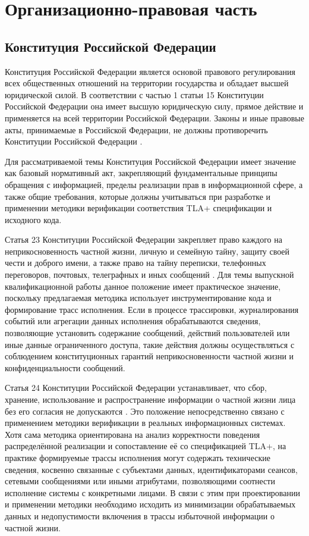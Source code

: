 
\section{Организационно-правовая часть}

\subsection{Конституция Российской Федерации}

Конституция Российской Федерации является основой правового регулирования
всех общественных отношений на территории государства и обладает высшей
юридической силой. В соответствии с частью 1 статьи 15 Конституции
Российской Федерации она имеет высшую юридическую силу, прямое действие и
применяется на всей территории Российской Федерации. Законы и иные
правовые акты, принимаемые в Российской Федерации, не должны противоречить
Конституции Российской Федерации \cite{constitution_rf}.

Для рассматриваемой темы Конституция Российской Федерации имеет значение
как базовый нормативный акт, закрепляющий фундаментальные принципы
обращения с информацией, пределы реализации прав в информационной сфере, а
также общие требования, которые должны учитываться при разработке и
применении методики верификации соответствия TLA+ спецификации и исходного
кода.

Статья 23 Конституции Российской Федерации закрепляет право каждого на
неприкосновенность частной жизни, личную и семейную тайну, защиту своей
чести и доброго имени, а также право на тайну переписки, телефонных
переговоров, почтовых, телеграфных и иных сообщений \cite{constitution_rf}.
Для темы выпускной квалификационной работы данное положение имеет
практическое значение, поскольку предлагаемая методика использует
инструментирование кода и формирование трасс исполнения. Если в процессе
трассировки, журналирования событий или агрегации данных исполнения
обрабатываются сведения, позволяющие установить содержание сообщений,
действий пользователей или иные данные ограниченного доступа, такие
действия должны осуществляться с соблюдением конституционных гарантий
неприкосновенности частной жизни и конфиденциальности сообщений.

Статья 24 Конституции Российской Федерации устанавливает, что сбор,
хранение, использование и распространение информации о частной жизни лица
без его согласия не допускаются \cite{constitution_rf}. Это положение
непосредственно связано с применением методики верификации в реальных
информационных системах. Хотя сама методика ориентирована на анализ
корректности поведения распределённой реализации и сопоставление её со
спецификацией TLA+, на практике формируемые трассы исполнения могут
содержать технические сведения, косвенно связанные с субъектами данных,
идентификаторами сеансов, сетевыми сообщениями или иными атрибутами,
позволяющими соотнести исполнение системы с конкретными лицами. В связи с
этим при проектировании и применении методики необходимо исходить из
минимизации обрабатываемых данных и недопустимости включения в трассы
избыточной информации о частной жизни.

